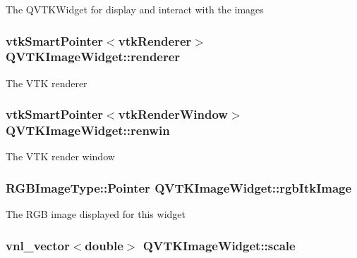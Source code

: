 The Q\-V\-T\-K\-Widget for display and interact with the images \hypertarget{class_q_v_t_k_image_widget_a06c273e6e390e8e860fa4c0c932a2cf8}{
\subsubsection[{renderer}]{\setlength{\rightskip}{0pt plus 5cm}vtk\-Smart\-Pointer$<$vtk\-Renderer$>$ {\bf Q\-V\-T\-K\-Image\-Widget\-::renderer}}}\label{d8/dd7/class_q_v_t_k_image_widget_a06c273e6e390e8e860fa4c0c932a2cf8}
The V\-T\-K renderer \hypertarget{class_q_v_t_k_image_widget_a1ffdb2716a14bd2cb4dc845c50fc474c}{
\subsubsection[{renwin}]{\setlength{\rightskip}{0pt plus 5cm}vtk\-Smart\-Pointer$<$vtk\-Render\-Window$>$ {\bf Q\-V\-T\-K\-Image\-Widget\-::renwin}}}\label{d8/dd7/class_q_v_t_k_image_widget_a1ffdb2716a14bd2cb4dc845c50fc474c}
The V\-T\-K render window \hypertarget{class_q_v_t_k_image_widget_ae8cea614979ccdb6fe65551c8269b116}{
\subsubsection[{rgb\-Itk\-Image}]{\setlength{\rightskip}{0pt plus 5cm}R\-G\-B\-Image\-Type\-::\-Pointer {\bf Q\-V\-T\-K\-Image\-Widget\-::rgb\-Itk\-Image}}}\label{d8/dd7/class_q_v_t_k_image_widget_ae8cea614979ccdb6fe65551c8269b116}
The R\-G\-B image displayed for this widget \hypertarget{class_q_v_t_k_image_widget_a9c5324e5b044bf1e55f3205002d69da0}{
\subsubsection[{scale}]{\setlength{\rightskip}{0pt plus 5cm}vnl\-\_\-vector$<$double$>$ {\bf Q\-V\-T\-K\-Image\-Widget\-::scale}}}\label{d8/dd7/class_q_v_t_k_image_widget_a9c5324e5b044bf1e55f3205002d69da0}
